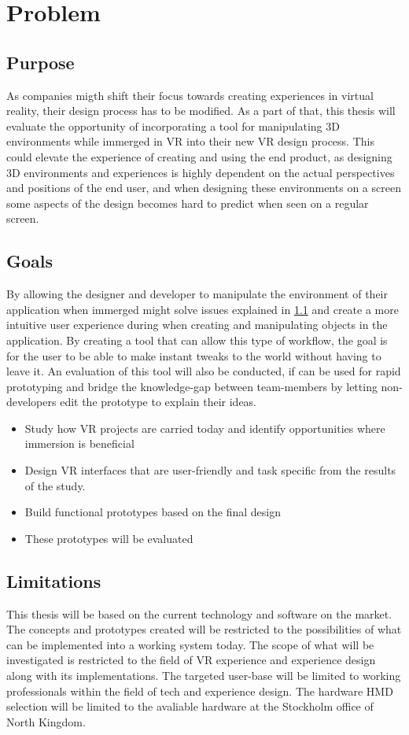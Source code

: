 \section{Problem}

\subsection{Purpose}
\label{intro:purpose}
As companies migth shift their focus towards creating experiences in virtual reality, their design process has to be modified. As a part of that, this thesis will evaluate the opportunity of incorporating a tool for manipulating 3D environments while immerged in VR into their new VR design process. This could elevate the experience of creating and using the end product, as designing 3D environments and experiences is highly dependent on the actual perspectives and positions of the end user, and when designing these environments on a screen some aspects of the design becomes hard to predict when seen on a regular screen.

\subsection{Goals}
By allowing the designer and developer to manipulate the environment of their application when immerged might solve issues explained in \ref{intro:purpose} and create a more intuitive user experience during when creating and manipulating objects in the application. By creating a tool that can allow this type of workflow, the goal is for the user to be able to make instant tweaks to the world without having to leave it. An evaluation of this tool will also be conducted, if can be used for rapid prototyping and bridge the knowledge-gap between team-members by letting non-developers edit the prototype to explain their ideas.


\begin{itemize}
	\item Study how VR projects are carried today and identify opportunities where immersion is beneficial
	\item Design VR interfaces that are user-friendly and task specific from the results of the study.
	\item Build functional prototypes based on the final design
	\item These prototypes will be evaluated
\end{itemize}

\subsection{Limitations}
This thesis will be based on the current technology and software on the market. The concepts and prototypes created will be restricted to the possibilities of what can be implemented into a working system today. The scope of what will be investigated is restricted to the field of VR experience and experience design along with its implementations. The targeted user-base will be limited to working professionals within the field of tech and experience design. The hardware HMD selection will be limited to the avaliable hardware at the Stockholm office of North Kingdom.

